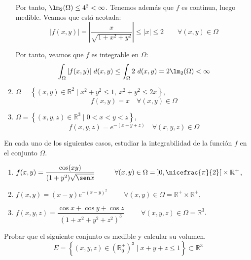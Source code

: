 \begin{ejercicio}
\begin{enumerate}
        Por tanto, $\lm_2(\Omega) \leq 4^2 < \infty$. Tenemos además que $f$ es continua, luego medible. Veamos que está acotada:
        \begin{equation*}
            |f(x,y)| = \left| \frac{x}{\sqrt{1 + x^2 + y^2}} \right| \leq |x| \leq 2
            \qquad \forall (x, y) \in \Omega
        \end{equation*}

        Por tanto, veamos que $f$ es integrable en $\Omega$:
        \begin{equation*}
            \int_{\Omega} |f(x, y)|~d(x, y) \leq \int_{\Omega} 2~d(x, y) = 2 \lm_2(\Omega) < \infty
        \end{equation*}

        \item \(\Omega = \left\{ (x, y) \in \mathbb{R}^2 \mid x^2 + y^2 \leq 1,~x^2 + y^2 \leq 2x \right\} \),
        \[ f(x, y) = x \quad \forall (x, y) \in \Omega \]

        \item \(\Omega = \left\{ (x, y, z) \in \mathbb{R}^3 \mid 0 < x < y < z \right\} \),
        \[ f(x, y, z) = e^{-(x+y+z)} \quad \forall (x, y, z) \in \Omega \]
    \end{enumerate}

\end{ejercicio}

\begin{ejercicio}
    En cada uno de los siguientes casos, estudiar la integrabilidad de la función \( f \) en el conjunto \( \Omega \).
    \begin{enumerate}
        \item $f(x, y) = \dfrac{\cos (x y)}{(1 + y^2) \sqrt{\sen x}} \hspace{1cm} \forall (x, y) \in \Omega= \left]0, \nicefrac{\pi}{2}\right[ \times \mathbb{R}^+$,
        
        \item $f(x, y) = (x - y) e^{-(x-y)^2} \hspace{1cm} \forall (x, y) \in \Omega= \mathbb{R}^+ \times \mathbb{R}^+$,
        \item $f(x, y, z) = \dfrac{\cos x + \cos y + \cos z}{(1 + x^2 + y^2 + z^2)^3} \hspace{1cm} \forall (x, y, z) \in \Omega= \mathbb{R}^3$.
    \end{enumerate}
\end{ejercicio}

\begin{ejercicio}
    Probar que el siguiente conjunto es medible y calcular su volumen.
    \[ E = \left\{ (x, y, z) \in \left(\mathbb{R}^+_0\right)^3 \mid x + y + z \leq 1 \right\} \subset \mathbb{R}^3 \]
\end{ejercicio}
    